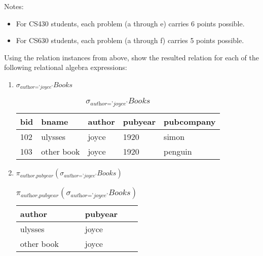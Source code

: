 \documentclass[letterpaper, 11pt]{article}
\begin{document}
Notes:
\begin{itemize}
    \item For CS430 students, each problem (a through e) carries 6 points possible.
    \item For CS630 students, each problem (a through f) carries 5 points possible. 
\end{itemize}

Using the relation instances from above, show the resulted relation for each of the following relational algebra expressions:
\begin{enumerate}[label={\alph*})]
    \item $\sigma_{\textit{author='joyce'}}\textit{Books}$
    \begin{table}[H]
        \centering
        \caption*{$\sigma_{\textit{author='joyce'}}\textit{Books}$}
        \begin{tabular}{|l|l|l|l|l|}
        \hline
            \cellcolor[HTML]{b4c6e7} bid & \cellcolor[HTML]{b4c6e7} bname & \cellcolor[HTML]{b4c6e7} author & \cellcolor[HTML]{b4c6e7} pubyear & \cellcolor[HTML]{b4c6e7} pubcompany \\
            \hline
            102 & ulysses & joyce & 1920 & simon \\
            \hline
            103 & other book & joyce & 1920 & penguin \\
            \hline
        \end{tabular}
    \end{table}
    
    \item $\pi_{\textit{author,pubyear}}(\sigma_{\textit{author='joyce'}}\textit{Books})$
    \begin{table}[H]
        \centering
        \caption*{$\pi_{\textit{author,pubyear}}(\sigma_{\textit{author='joyce'}}\textit{Books})$}
        \begin{tabular}{|l|l|}
        \hline
            \cellcolor[HTML]{b4c6e7} author & \cellcolor[HTML]{b4c6e7} pubyear \\
            \hline
            ulysses & joyce \\
            \hline
            other book & joyce \\
            \hline
        \end{tabular}
    \end{table}
    

\end{enumerate}
\end{document}

